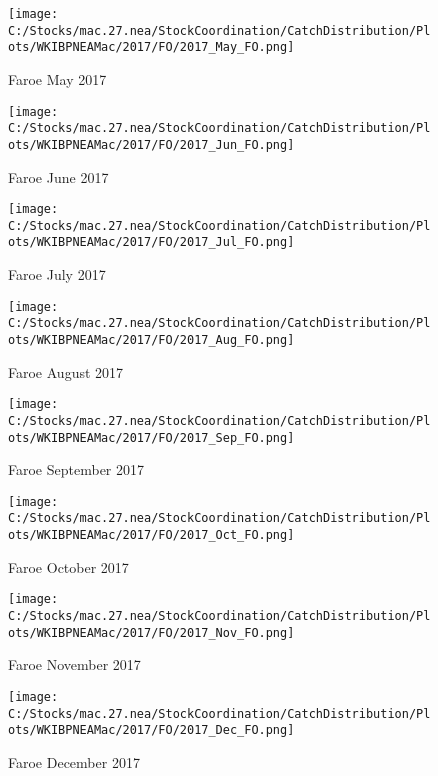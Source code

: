 \documentclass{article}
\begin{document}
\begin{figure}
	\centering
		\texttt{[image: C:/Stocks/mac.27.nea/StockCoordination/CatchDistribution/Plots/WKIBPNEAMac/2017/FO/2017\_May\_FO.png]}
	\caption{Faroe May 2017}
	\label{fig:2017_May_FO}
\end{figure}

\begin{figure}
	\centering
		\texttt{[image: C:/Stocks/mac.27.nea/StockCoordination/CatchDistribution/Plots/WKIBPNEAMac/2017/FO/2017\_Jun\_FO.png]}
	\caption{Faroe June 2017}
	\label{fig:2017_Jun_FO}
\end{figure}

\begin{figure}
	\centering
		\texttt{[image: C:/Stocks/mac.27.nea/StockCoordination/CatchDistribution/Plots/WKIBPNEAMac/2017/FO/2017\_Jul\_FO.png]}
	\caption{Faroe July 2017}
	\label{fig:2017_Jul_FO}
\end{figure}

\begin{figure}
	\centering
		\texttt{[image: C:/Stocks/mac.27.nea/StockCoordination/CatchDistribution/Plots/WKIBPNEAMac/2017/FO/2017\_Aug\_FO.png]}
	\caption{Faroe August 2017}
	\label{fig:2017_Aug_FO}
\end{figure}

\begin{figure}
	\centering
		\texttt{[image: C:/Stocks/mac.27.nea/StockCoordination/CatchDistribution/Plots/WKIBPNEAMac/2017/FO/2017\_Sep\_FO.png]}
	\caption{Faroe September 2017}
	\label{fig:2017_Sep_FO}
\end{figure}

\begin{figure}
	\centering
		\texttt{[image: C:/Stocks/mac.27.nea/StockCoordination/CatchDistribution/Plots/WKIBPNEAMac/2017/FO/2017\_Oct\_FO.png]}
	\caption{Faroe October 2017}
	\label{fig:2017_Oct_FO}
\end{figure}

\begin{figure}
	\centering
		\texttt{[image: C:/Stocks/mac.27.nea/StockCoordination/CatchDistribution/Plots/WKIBPNEAMac/2017/FO/2017\_Nov\_FO.png]}
	\caption{Faroe November 2017}
	\label{fig:2017_Nov_FO}
\end{figure}

\begin{figure}
	\centering
		\texttt{[image: C:/Stocks/mac.27.nea/StockCoordination/CatchDistribution/Plots/WKIBPNEAMac/2017/FO/2017\_Dec\_FO.png]}
	\caption{Faroe December 2017}
	\label{fig:2017_Dec_FO}
\end{figure}
\end{document}
